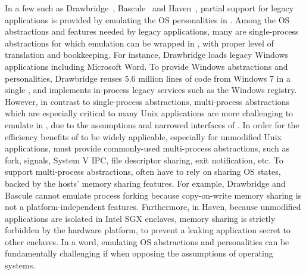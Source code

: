 

In a few \liboses{} such as Drawbridge~\citep{porter11drawbridge}, Bascule~\citep{baumann13bascule} and Haven~\citep{baumann14haven},
partial support for legacy applications is provided
by emulating the OS personalities in \picoprocs{}.
Among the OS abstractions and features needed by legacy applications,
many are single-process abstractions
for which emulation can be wrapped in \picoprocs{}, with proper level of translation and bookkeeping.
For instance, Drawbridge loads legacy Windows applications including Microsoft Word.
To provide Windows abstractions and personalities,
Drawbridge reuses 5.6 million lines of code from Windows 7 in a single \picoproc{},
and implements in-process legacy services such as the Windows registry.
However, in contrast to single-process abstractions,
multi-process abstractions which are especially critical to many Unix applications
are more challenging to emulate in \picoprocs{},
due to the assumptions and narrowed interfaces of \picoprocs{}.
In order for the efficiency benefits of \liboses{} to be widely applicable,
especially for unmodified Unix applications,
\liboses{} must provide commonly-used multi-process abstractions,
such as fork, signals, System V IPC, file descriptor sharing, exit notification, etc.
To support multi-process abstractions, \liboses{} often have to rely on sharing OS states,
backed by the hosts' memory sharing features.
For example, Drawbridge and Bascule cannot emulate process forking because copy-on-write memory sharing is not a platform-independent features.
Furthermore, in Haven, because unmodified applications are isolated
in Intel SGX enclaves,
memory sharing is strictly forbidden by the hardware platform,
to prevent a \picoproc{} leaking application secret to other enclaves.
In a word, emulating OS abstractions and personalities can be fundamentally challenging
if when opposing the assumptions of operating systems. 


